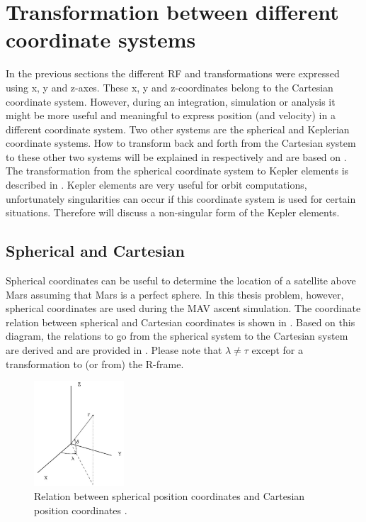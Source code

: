 \section{Transformation between different coordinate systems}
\label{sec:transsys}
In the previous sections the different \ac{RF} and transformations were expressed using x, y and z-axes. These x, y and z-coordinates belong to the Cartesian coordinate system. However, during an integration, simulation or analysis it might be more useful and meaningful to express position (and velocity) in a different coordinate system. Two other systems are the spherical and Keplerian coordinate systems. How to transform back and forth from the Cartesian system to these other two systems will be explained in  respectively and are based on \cite{noomen2013basic}. The transformation from the spherical coordinate system to Kepler elements is described in . Kepler elements are very useful for orbit computations, unfortunately singularities can occur if this coordinate system is used for certain situations. Therefore  will discuss a non-singular form of the Kepler elements. 

\subsection{Spherical and Cartesian}
\label{subsec:sphercart}
Spherical coordinates can be useful to determine the location of a satellite above Mars assuming that Mars is a perfect sphere. In this thesis problem, however, spherical coordinates are used during the \ac{MAV} ascent simulation. The coordinate relation between spherical and Cartesian coordinates is shown in . Based on this diagram, the relations to go from the spherical system to the Cartesian system are derived and are provided in . Please note that $\lambda\neq\tau$ except for a transformation to (or from) the R-frame.

\begin{figure}[!ht]
\centering
\includegraphics[width=0.3\textwidth]{figures/reference_frames/sphertocart_noomen2013basic.jpg}
\caption{Relation between spherical position coordinates and Cartesian position coordinates \cite{noomen2013basic}.}
\label{fig:sphertocart_noomen2013basic}
\end{figure}

